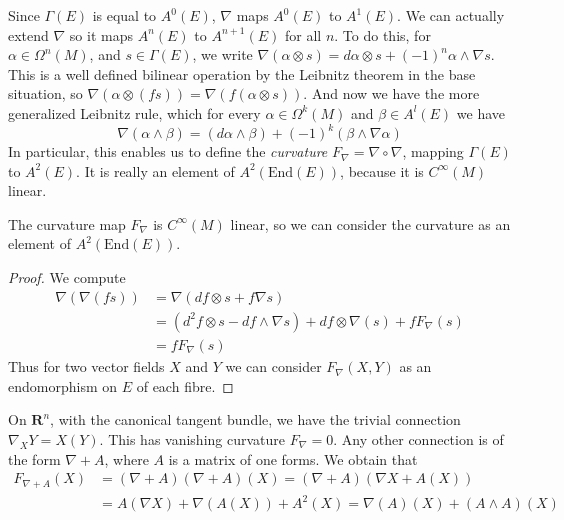 Since $\Gamma(E)$ is equal to $A^0(E)$, $\nabla$ maps $A^0(E)$ to $A^1(E)$. We can actually extend $\nabla$ so it maps $A^n(E)$ to $A^{n+1}(E)$ for all $n$. To do this, for $\alpha \in \Omega^n(M)$, and $s \in \Gamma(E)$, we write $\nabla(\alpha \otimes s) = d\alpha \otimes s + (-1)^n \alpha \wedge \nabla s$. This is a well defined bilinear operation by the Leibnitz theorem in the base situation, so $\nabla(\alpha \otimes (fs)) = \nabla(f (\alpha \otimes s))$. And now we have the more generalized Leibnitz rule, which for every $\alpha \in \Omega^k(M)$ and $\beta \in A^l(E)$ we have
%
\[ \nabla(\alpha \wedge \beta) = (d\alpha \wedge \beta) + (-1)^k (\beta \wedge \nabla \alpha) \]
%
In particular, this enables us to define the \emph{curvature} $F_\nabla = \nabla \circ \nabla$, mapping $\Gamma(E)$ to $A^2(E)$. It is really an element of $A^2(\text{End}(E))$, because it is $C^\infty(M)$ linear.

\begin{theorem}
    The curvature map $F_\nabla$ is $C^\infty(M)$ linear, so we can consider the curvature as an element of $A^2(\text{End}(E))$.
\end{theorem}
\begin{proof}
    We compute
    \begin{align*}
        \nabla(\nabla(fs)) &= \nabla(df \otimes s + f \nabla s)\\
        &= (d^2f \otimes s - df \wedge \nabla s) + df \otimes \nabla(s) + f F_\nabla(s)\\
        &= f F_\nabla(s)
    \end{align*}
    Thus for two vector fields $X$ and $Y$ we can consider $F_\nabla(X,Y)$ as an endomorphism on $E$ of each fibre.
\end{proof}

\begin{example}
    On $\mathbf{R}^n$, with the canonical tangent bundle, we have the trivial connection $\nabla_X Y = X(Y)$. This has vanishing curvature $F_\nabla = 0$. Any other connection is of the form $\nabla + A$, where $A$ is a matrix of one forms. We obtain that
    \begin{align*}
        F_{\nabla + A}(X) &= (\nabla + A)(\nabla + A)(X) = (\nabla + A)(\nabla X + A(X))\\
        &= A(\nabla X) + \nabla(A(X)) + A^2(X) = \nabla(A)(X) + (A \wedge A)(X)
    \end{align*}
\end{example}






